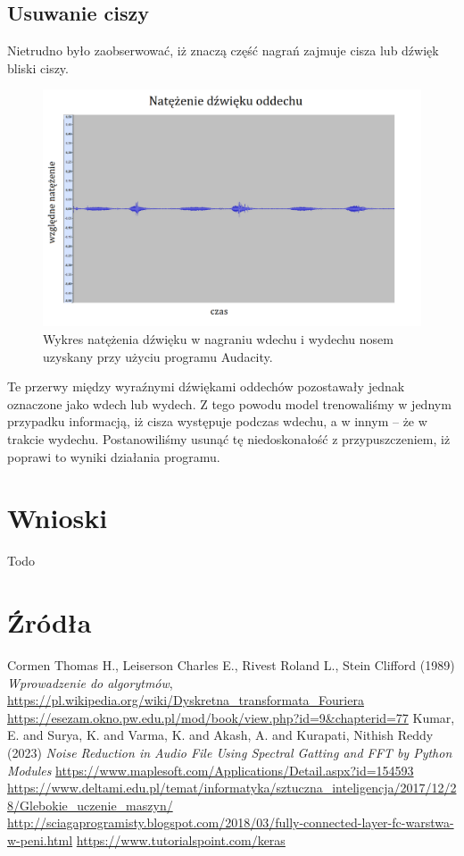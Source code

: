 \documentclass[polish]{article}
\begin{document}
\subsection{Usuwanie ciszy}
Nietrudno było zaobserwować, iż znaczą część nagrań zajmuje cisza lub dźwięk bliski ciszy.
\begin{figure}[H]
	\centering
	\includegraphics[width=13cm]{natezenie_wydech_nosem}
	\caption{Wykres natężenia dźwięku w nagraniu wdechu i wydechu nosem uzyskany przy użyciu programu Audacity.}
\end{figure}
Te przerwy między wyraźnymi dźwiękami oddechów pozostawały jednak oznaczone jako wdech lub wydech. Z tego powodu model trenowaliśmy w jednym przypadku informacją, iż cisza występuje podczas wdechu, a w innym -- że w trakcie wydechu. Postanowiliśmy usunąć tę niedoskonałość z przypuszczeniem, iż poprawi to wyniki działania programu.

\section{Wnioski}
Todo
\section{Źródła}
\begin{thebibliography}{2}
 Cormen Thomas H., Leiserson Charles E., Rivest Roland L., Stein Clifford (1989) \emph{Wprowadzenie do algorytmów},
\url{https://pl.wikipedia.org/wiki/Dyskretna_transformata_Fouriera}
\url{https://esezam.okno.pw.edu.pl/mod/book/view.php?id=9&chapterid=77}
Kumar, E. and Surya, K. and Varma, K. and Akash, A. and Kurapati, Nithish Reddy (2023) \emph{Noise Reduction in Audio File Using Spectral Gatting and FFT by Python Modules}
\url{https://www.maplesoft.com/Applications/Detail.aspx?id=154593}
\url{https://www.deltami.edu.pl/temat/informatyka/sztuczna_inteligencja/2017/12/28/Glebokie_uczenie_maszyn/}
\url{http://sciagaprogramisty.blogspot.com/2018/03/fully-connected-layer-fc-warstwa-w-peni.html}
\url{https://www.tutorialspoint.com/keras}
\end{thebibliography}
\end{document}
